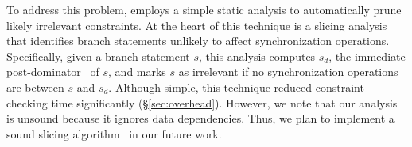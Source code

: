 To address this problem, \tern employs a simple static analysis to
automatically prune likely irrelevant constraints.  At the heart of this
technique is a slicing analysis that identifies branch statements unlikely
to affect synchronization operations.  Specifically, given a branch
statement $s$, this analysis computes $s_d$, the immediate
post-dominator~\cite{aho:dragon:06} of $s$, and marks $s$ as irrelevant if
no synchronization operations are between $s$ and $s_d$.  Although simple,
this technique reduced constraint checking time significantly
(\S\ref{sec:overhead}).  However, we note that our analysis is unsound
because it ignores data dependencies.  Thus, we plan to implement a sound
slicing algorithm~\cite{castro:bouncer} in our future work.

















